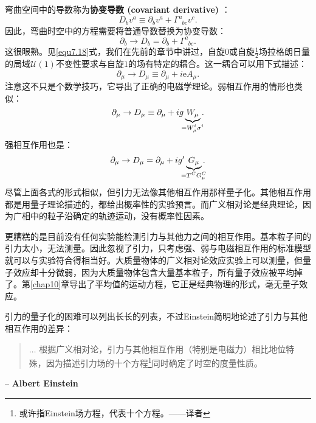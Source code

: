 弯曲空间中的导数称为{\bf 协变导数 (covariant derivative)}%
%
：
\begin{equation}
\label{equ12.10}
    D_b v^a \equiv \partial_b v^a + \Gamma^a_{\phantom{a}bc} v^c.
\end{equation}
因此，弯曲时空中的方程需要将普通导数替换为协变导数：
\begin{equation}
\label{equ12.11}
    \partial_b \to D_b = \partial_b + \Gamma^a_{\phantom{a}bc}.
\end{equation}
这很眼熟。见\ref{equ7.18}式，我们在先前的章节中讲过，自旋$0$或自旋$\frac{1}{2}$场拉格朗日量的局域$\mathcal{U}(1)$不变性要求与自旋$1$的场有特定的耦合。这一耦合可以用下式描述：
\begin{equation}
\label{equ12.12}
    \partial_\mu \to D_\mu \equiv \partial_\mu + i \mathrm{e} A_\mu.
\end{equation}
注意这不只是个数学技巧，它导出了正确的电磁学理论。弱相互作用的情形也类似：
\begin{equation}
\label{equ12.13}
    \partial_\mu \to D_\mu \equiv \partial_\mu + i g \underbrace{W_\mu}_{\mathclap{= W_\mu^i \sigma^i}}.
\end{equation}
强相互作用也是：
\begin{equation}
\label{equ12.14}
    \partial_\mu \to D_\mu = \partial_\mu + i g' \underbrace{G_\mu}_{\mathclap{= T^C G^C_\mu}}.
\end{equation}
尽管上面各式的形式相似，但引力无法像其他相互作用那样量子化。其他相互作用都是用量子理论描述的，都给出概率性的实验预言。而广义相对论是经典理论，因为广相中的粒子沿确定的轨迹运动，没有概率性因素。

更糟糕的是目前没有任何实验能检测引力与其他力之间的相互作用。基本粒子间的引力太小，无法测量。因此忽视了引力，只考虑强、弱与电磁相互作用的标准模型就可以与实验符合得相当好。大质量物体的广义相对论效应实验上可以测量，但量子效应却十分微弱，因为大质量物体包含大量基本粒子，所有量子效应被平均掉了。第\ref{chap10}章导出了平均值的运动方程，它正是经典物理的形式，毫无量子效应。

引力的量子化的困难可以列出长长的列表，不过Einstein简明地论述了引力与其他相互作用的差异：
\begin{quote}
$\dots$ 根据广义相对论，引力与其他相互作用（特别是电磁力）相比地位特殊，因为描述引力场的十个方程\footnote{或许指Einstein场方程，代表十个方程。——译者}同时确定了时空的度量性质。
\end{quote}
\begin{flushright}
-- {\bf Albert Einstein}
\end{flushright}

